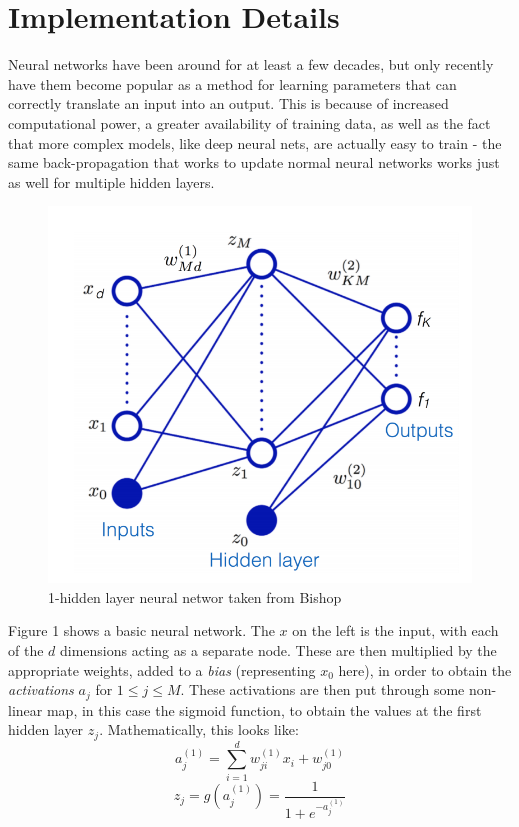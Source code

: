 \documentclass[11pt,letterpaper]{article}
\begin{document}
\section{Implementation Details}
Neural networks have been around for at least a few decades, but only recently have them become popular as a method for learning parameters that can correctly translate an input into an output. This is because of increased computational power, a greater availability of training data, as well as the fact that more complex models, like deep neural nets, are actually easy to train - the same back-propagation that works to update normal neural networks works just as well for multiple hidden layers.
\begin{figure}[!htb]
\centering
{}
  \includegraphics[width=\linewidth]{figures/neural.png}
  \caption{1-hidden layer neural networ taken from Bishop}\label{fig:neural}
\endminipage\hfill
\end{figure}
Figure 1 shows a basic neural network. The $x$ on the left is the input, with each of the $d$ dimensions acting as a separate node. These are then multiplied by the appropriate weights, added to a \textit{bias} (representing $x_0$ here), in order to obtain the \textit{activations} $a_j$ for $1\le j\le M$. These activations are then put through some non-linear map, in this case the sigmoid function, to obtain the values at the first hidden layer $z_j$. Mathematically, this looks like:
$$a_j^{(1)} = \sum_{i=1}^d w_{ji}^{(1)}x_i+w_{j0}^{(1)}$$
$$z_j = g(a_j^{(1)}) = \frac{1}{1 + e^{-a_j^{(1)}}}$$
\end{document}
